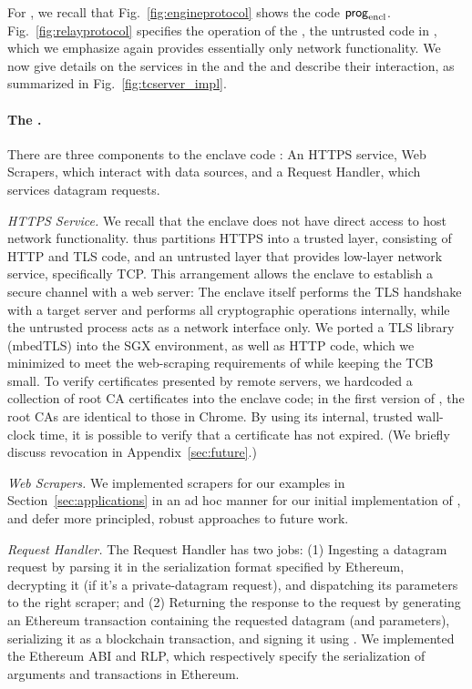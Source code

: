 For \tc, we recall that Fig.~\ref{fig:engineprotocol} shows the \encname code
${\sf prog}_{\textrm{encl}}$. Fig.~\ref{fig:relayprotocol} specifies the operation of the \medname,
the untrusted code in \tc, which we emphasize again provides essentially only
network functionality. We now give details on the services in the \encname and
the \medname and describe their interaction, as summarized in
Fig.~\ref{fig:tcserver_impl}.

\paragraph{\bf The \encname.} There are three components to the enclave code
\engine: An HTTPS service, Web Scrapers, which interact with data sources, and a
Request Handler, which services datagram requests. 

\vspace{2mm}

\noindent\emph{HTTPS Service.} We recall that the enclave does not have direct
access to host network functionality. \tc thus partitions HTTPS into a trusted
layer, consisting of HTTP and TLS code, and an untrusted layer that provides
low-layer network service, specifically TCP.  This arrangement allows the
enclave to establish a secure channel with a web server: The enclave itself
performs the TLS handshake with a target server and performs all cryptographic
operations internally, while the untrusted process acts as a network interface
only. We ported a TLS library (mbedTLS) into the SGX environment, as well as
HTTP code, which we minimized to meet the web-scraping requirements of \tc while
keeping the TCB small. To verify certificates presented by remote servers, we
hardcoded a collection of root CA certificates into the enclave code; in the
first version of \tc, the root CAs are identical to those in Chrome. By using its internal, trusted wall-clock time, it is possible to verify that a certificate has not expired. (We briefly discuss revocation in Appendix~\ref{sec:future}.)

\vspace{2mm}

\noindent\emph{Web Scrapers.} We implemented scrapers for our examples in Section~\ref{sec:applications} in an ad hoc manner for our initial implementation of \tc, and defer more principled, robust approaches to future work. 

\vspace{2mm}

\noindent\emph{Request Handler.} The Request Handler has two jobs: (1) Ingesting
a datagram request by parsing it in the serialization format specified by
Ethereum, decrypting it (if it's a private-datagram request), and dispatching
its parameters to the right scraper; and (2) Returning the response to the
request by generating an Ethereum transaction containing the requested datagram
(and parameters), serializing it as a blockchain transaction, and signing it
using \skTC. We implemented the Ethereum ABI and RLP, which respectively specify
the serialization of arguments and transactions in Ethereum. 

